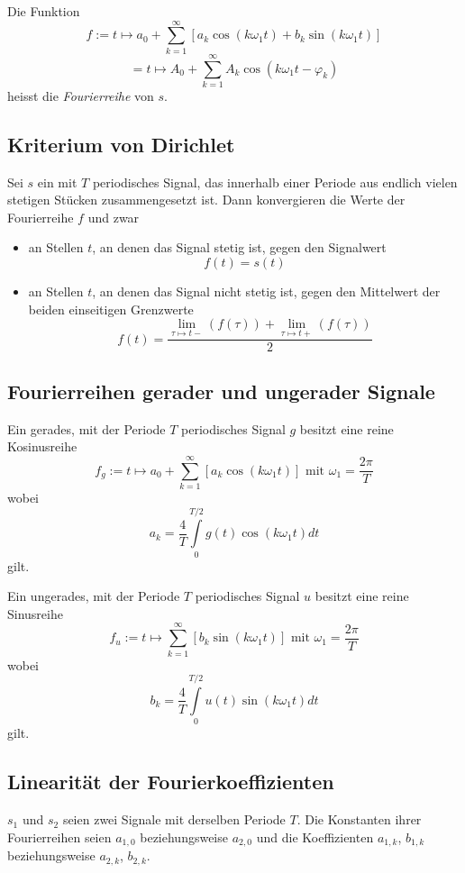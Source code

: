 \documentclass[10pt,a4paper]{scrartcl}
\begin{document}
Die Funktion
$$f := t \mapsto a_0 + \sum_{k=1}^{\infty} \left[a_k \cos(k\omega_1t) + b_k \sin(k\omega_1t)\right]$$
$$= t \mapsto A_0 + \sum_{k=1}^{\infty} A_k \cos(k\omega_1 t - \varphi_k)$$
heisst die \textit{Fourierreihe} von $s$.


\subsection{Kriterium von Dirichlet}

Sei $s$ ein mit $T$ periodisches Signal, das innerhalb einer Periode aus
endlich vielen stetigen Stücken zusammengesetzt ist. Dann konvergieren die
Werte der Fourierreihe $f$ und zwar
\begin{itemize}
\item an Stellen $t$, an denen das Signal stetig ist, gegen den Signalwert
$$f(t) = s(t)$$
\item an Stellen $t$, an denen das Signal nicht stetig ist, gegen den Mittelwert der beiden einseitigen Grenzwerte
$$f(t) = \frac{\lim\limits_{\tau \mapsto t-}(f(\tau)) + \lim\limits_{\tau \mapsto t+}(f(\tau))}{2}$$
\end{itemize}


\subsection{Fourierreihen gerader und ungerader Signale}

Ein gerades, mit der Periode $T$ periodisches Signal $g$ besitzt eine reine
Kosinusreihe
$$f_g := t \mapsto a_0 + \sum_{k=1}^{\infty} \left[ a_k \cos(k\omega_1t)\right] \textrm{ mit } \omega_1 = \frac{2\pi}{T}$$
wobei
$$a_k = \frac{4}{T} \int\limits_0^{T/2} g(t) \cos(k\omega_1t) dt$$
gilt.

Ein ungerades, mit der Periode $T$ periodisches Signal $u$ besitzt eine reine
Sinusreihe
$$f_u := t \mapsto \sum_{k=1}^{\infty} \left[ b_k \sin(k\omega_1t)\right] \textrm{ mit } \omega_1 = \frac{2\pi}{T}$$
wobei
$$b_k = \frac{4}{T} \int\limits_0^{T/2} u(t) \sin(k\omega_1t) dt$$
gilt.


\subsection{Linearität der Fourierkoeffizienten}

$s_1$ und $s_2$ seien zwei Signale mit derselben Periode $T$. Die Konstanten
ihrer Fourierreihen seien $a_{1,0}$ beziehungsweise $a_{2,0}$ und die
Koeffizienten $a_{1,k}$, $b_{1,k}$ beziehungsweise $a_{2,k}$, $b_{2,k}$.
\end{document}
